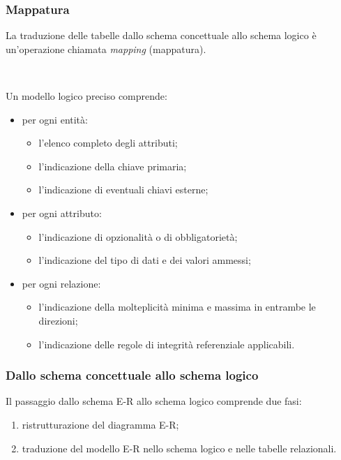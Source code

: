 \documentclass[]{beamer}
\begin{document}
\begin{frame}
\frametitle{Mappatura}
La traduzione delle tabelle dallo schema concettuale allo schema logico è un'operazione chiamata \emph{mapping} (mappatura).

~

Un modello logico preciso comprende:
\begin{itemize}
  \item per ogni entità:
  \begin{itemize}
    \item l'elenco completo degli attributi;
    \item l'indicazione della chiave primaria;
    \item l'indicazione di eventuali chiavi esterne;
  \end{itemize}
  \item per ogni attributo:
  \begin{itemize}
    \item l'indicazione di opzionalità o di obbligatorietà;
    \item l'indicazione del tipo di dati e dei valori ammessi;
  \end{itemize}
  \item per ogni relazione:
  \begin{itemize}
    \item l'indicazione della molteplicità minima e massima in entrambe le direzioni;
    \item l'indicazione delle regole di integrità referenziale applicabili.
  \end{itemize}
\end{itemize}
\end{frame}


\begin{frame}
\frametitle{Dallo schema concettuale allo schema logico}
Il passaggio dallo schema E-R allo schema logico comprende due fasi:
\begin{enumerate}
  \item ristrutturazione del diagramma E-R;\pause
  \item traduzione del modello E-R nello schema logico e nelle tabelle relazionali.
\end{enumerate}

~

\end{frame}
\end{document}
